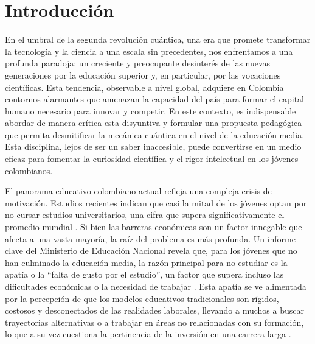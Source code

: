 \documentclass[10pt,a4paper]{article}
\begin{document}


\section{Introducción}

En el umbral de la segunda revolución cuántica, una era que promete transformar la tecnología y la ciencia a una escala sin precedentes, nos enfrentamos a una profunda paradoja: un creciente y preocupante desinterés de las nuevas generaciones por la educación superior y, en particular, por las vocaciones científicas. Esta tendencia, observable a nivel global, adquiere en Colombia contornos alarmantes que amenazan la capacidad del país para formar el capital humano necesario para innovar y competir. En este contexto, es indispensable abordar de manera crítica esta disyuntiva y formular una propuesta pedagógica que permita desmitificar la mecánica cuántica en el nivel de la educación media. Esta disciplina, lejos de ser un saber inaccesible, puede convertirse en un medio eficaz para fomentar la curiosidad científica y el rigor intelectual en los jóvenes colombianos.

El panorama educativo colombiano actual refleja una compleja crisis de motivación. Estudios recientes indican que casi la mitad de los jóvenes optan por no cursar estudios universitarios, una cifra que supera significativamente el promedio mundial \cite{Infobae2025}. Si bien las barreras económicas son un factor innegable que afecta a una vasta mayoría, la raíz del problema es más profunda. Un informe clave del Ministerio de Educación Nacional revela que, para los jóvenes que no han culminado la educación media, la razón principal para no estudiar es la apatía o la ``falta de gusto por el estudio'', un factor que supera incluso las dificultades económicas o la necesidad de trabajar \cite{Minedu2022}. Esta apatía se ve alimentada por la percepción de que los modelos educativos tradicionales son rígidos, costosos y desconectados de las realidades laborales, llevando a muchos a buscar trayectorias alternativas o a trabajar en áreas no relacionadas con su formación, lo que a su vez cuestiona la pertinencia de la inversión en una carrera larga \cite{Infobae2025, Mosquera2024, Ortiz2024}.
\end{document}

